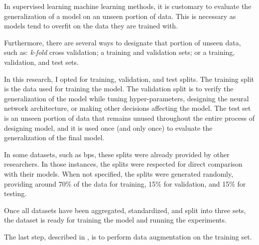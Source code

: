 
In supervised learning machine learning methods, it is
customary to evaluate the generalization of a model on an
unseen portion of data. This is necessary as models tend to
\gls{overfit} on the data they are trained with.

Furthermore, there are several ways to designate that
portion of unseen data, such as: \emph{k-fold} cross
validation; a training and validation sets; or a training,
validation, and test sets. 

In this research, I opted for training, validation, and test
splits. The training split is the data used for training the
model. The validation split is to verify the generalization
of the model while tuning hyper-parameters, designing the
neural network architecture, or making other decisions
affecting the model. The test set is an unseen portion of
data that remains unused throughout the entire process of
designing model, and it is used once (and only once) to
evaluate the generalization of the final model.

In some datasets, such as \gls{bps}, these splits were
already provided by other researchers. In those instances,
the splits were respected for direct comparison with their
models. When not specified, the splits were generated
randomly, providing around 70\% of the data for training,
15\% for validation, and 15\% for testing.

Once all datasets have been aggregated, standardized, and
split into three sets, the dataset is ready for training the
model and running the experiments.

The last step, described in , is to
perform data augmentation on the training set.
